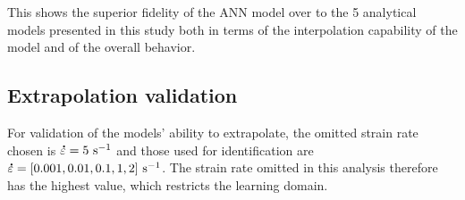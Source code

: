 \documentclass[twoside,english,1p,final,sort&compress]{elsarticle}
\theoremstyle{plain}
\DeclareRobustCommand{\mdot}[1]{\accentset{\mbox{\bfseries .}}{#1}}
\DeclareRobustCommand{\ps}{\text{s}^{-1}}
\begin{document}
This shows the superior fidelity of the ANN model over to the 5 analytical models presented in this study both in terms of the interpolation capability of the model and of the overall behavior.

\subsection{Extrapolation validation}

For validation of the models' ability to extrapolate, the omitted strain rate chosen is $\mdot\varepsilon=5~\ps$ and those used for identification are $\mdot\varepsilon=[0.001, 0.01, 0.1, 1, 2]~\ps$.
The strain rate omitted in this analysis therefore has the highest value, which restricts the learning domain.
\end{document}
